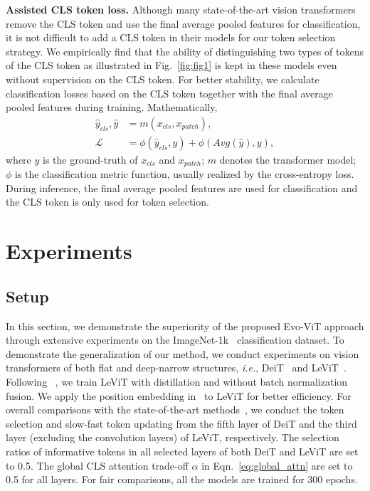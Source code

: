 \documentclass[letterpaper]{article} \usepackage{aaai22}  \usepackage{times}  \usepackage{helvet}  \usepackage{courier}  \usepackage[hyphens]{url}  \usepackage{graphicx} \urlstyle{rm} \def\UrlFont{\rm}  \usepackage{natbib}  \usepackage{caption} \DeclareCaptionStyle{ruled}{labelfont=normalfont,labelsep=colon,strut=off} \frenchspacing  \setlength{\pdfpagewidth}{8.5in}  \setlength{\pdfpageheight}{11in}  \usepackage{algorithm}
\begin{document}
\noindent\textbf{Assisted CLS token loss.}
Although many state-of-the-art vision transformers~\cite{PVT,LeViT} remove the CLS token and use the final average pooled features for classification, it is not difficult to add a CLS token in their models for our token selection strategy. We empirically find that the ability of distinguishing two types of tokens of the CLS token as illustrated in Fig.~\ref{fig:fig1} is kept in these models even without supervision on the CLS token. For better stability, we calculate classification losses based on the CLS token together with the final average pooled features during training. Mathematically, 
\begin{equation}
    \begin{split}
        \hat{y}_{cls},\hat{y}&=m(x_{cls},x_{patch}), \\
        \mathcal{L} &= \phi(\hat{y}_{cls},y)+\phi(Avg(\hat{y}),y),
    \end{split}
\end{equation}
where $y$ is the ground-truth of $x_{cls}$ and $x_{patch}$; $m$ denotes the transformer model; $\phi$ is the classification metric function, usually realized by the cross-entropy loss.
During inference, the final average pooled features are used for classification and the CLS token is only used for token selection. 

%
 
\section{Experiments}
\label{sec:experiments}

\subsection{Setup}
In this section, we demonstrate the superiority of the proposed Evo-ViT approach through extensive experiments on the ImageNet-1k~\cite{imagenet} classification dataset. To demonstrate the generalization of our method, we conduct experiments on vision transformers of both flat and deep-narrow structures, \emph{i.e.}, DeiT~\cite{DeiT} and LeViT~\cite{LeViT}. Following ~\cite{LeViT}, we train LeViT with distillation and without batch normalization fusion.
We apply the position embedding in~\cite{PVT} to LeViT for better efficiency.
For overall comparisons with the state-of-the-art methods~\cite{DynamicViT,PatchSlimming,SViTE,IA-RED2}, we conduct the token selection and slow-fast token updating from the fifth layer of DeiT and 
the third layer (excluding the convolution layers) of LeViT, respectively. The selection ratios of informative tokens in all selected layers of both DeiT and LeViT are set to 0.5.
The global CLS attention trade-off $\alpha$ in Eqn.~\ref{eq:global_attn} are set to 0.5 for all layers.
For fair comparisons, all the models are trained for 300 epochs.
\end{document}
